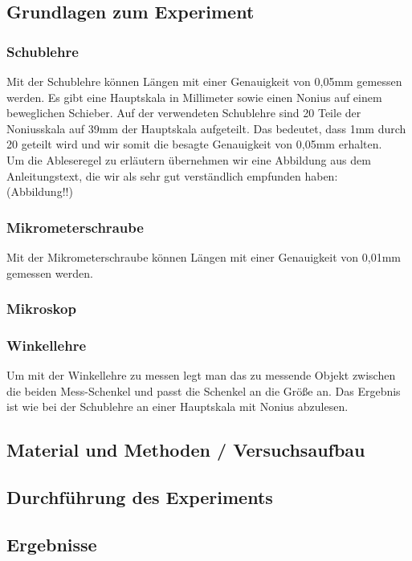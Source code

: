 \documentclass{article}
\begin{document}
\subsection{Grundlagen zum Experiment}
\subsubsection*{Schublehre}
Mit der Schublehre können Längen mit einer Genauigkeit von 0,05mm gemessen werden. Es gibt eine Hauptskala in Millimeter sowie einen Nonius auf einem beweglichen Schieber. Auf der verwendeten Schublehre sind 20 Teile der Noniusskala auf 39mm der Hauptskala aufgeteilt. Das bedeutet, dass 1mm durch 20 geteilt wird und wir somit die besagte Genauigkeit von 0,05mm erhalten.\\
Um die Ableseregel zu erläutern übernehmen wir eine Abbildung aus dem Anleitungstext, die wir als sehr gut verständlich empfunden haben:\\
(Abbildung!!)

\subsubsection*{Mikrometerschraube}
Mit der Mikrometerschraube können Längen mit einer Genauigkeit von 0,01mm gemessen werden.

\subsubsection*{Mikroskop}

\subsubsection*{Winkellehre}
Um mit der Winkellehre zu messen legt man das zu messende Objekt zwischen die beiden Mess-Schenkel und passt die Schenkel an die Größe an. Das Ergebnis ist wie bei der Schublehre an einer Hauptskala mit Nonius abzulesen.

\subsection{Material und Methoden / Versuchsaufbau}

\subsection{Durchführung des Experiments}

\subsection{Ergebnisse}
\end{document}
